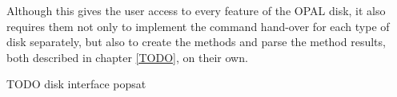 Although this gives the user access to every feature of the OPAL disk, it also requires them not only to implement the command hand-over for each type of disk separately, but also to create the methods and parse the method results, both described in chapter \ref{TODO}, on their own.

TODO disk interface popsat\cite{NVME}